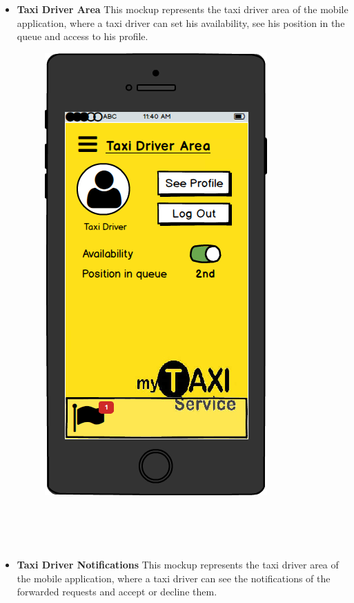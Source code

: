 \documentclass[18pt,oneside,a4paper, titlepage]{article}
\begin{document}
\begin{itemize}
\begin{figure}[h]
				\end{figure}
				\\ \\ \\
				\item \textbf{Taxi Driver Area} This mockup represents the taxi driver area of the mobile application, where a taxi driver can set his availability, see his position in the queue and access to his profile.\\
				\begin{figure}[h]
					\centering
					\includegraphics[scale=0.3]{MobileAppTaxiDriverArea.png}
				\end{figure}
				\\
				\\ \\ 
				\item \textbf{Taxi Driver Notifications} This mockup represents the taxi driver area of the mobile application, where a taxi driver can see the notifications of the forwarded requests and accept or decline them.\\

\end{itemize}
\end{document}
